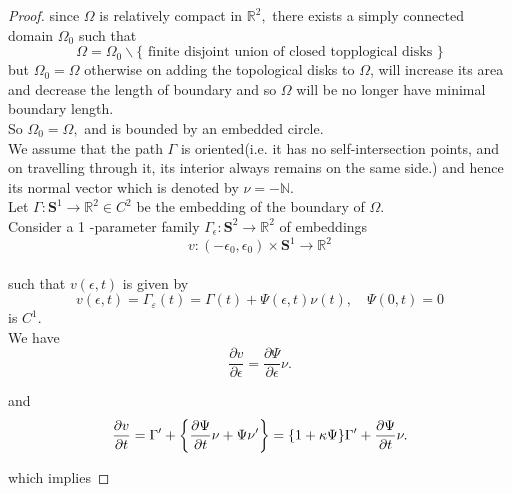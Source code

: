 \documentclass[oneside]{book}
\begin{document}
	
	\begin{proof}
		
		since $\Omega$ is relatively compact in $\mathbb{R}^{2},$ there exists a simply connected \\
		domain $\Omega_{0}$ such that
		$$
		\Omega=\Omega_{0} \backslash\{\text{ finite disjoint union of closed topplogical disks 
		}\} $$
		but $\Omega_{0}=\Omega $ otherwise on adding the topological disks to $\Omega$, will increase its area and decrease the length of boundary and so $\Omega$ will be no longer have minimal boundary length. \\
		So $\Omega_{0}=\Omega,$ and is bounded by an embedded circle.\\
		
		We assume that the path $\Gamma$ is oriented(i.e. it has no self-intersection points, and on travelling through it, its interior always remains on the same side.) and hence its normal vector which is denoted by $\nu = - \mathbb{N}$. \\
		
		
		Let $\Gamma: \mathbf{S}^{1} \rightarrow \mathbb{R}^{2} \in C^{2}$ be the embedding of the boundary of $\Omega .$ 
		\\ 
		Consider a    1 -parameter family $\Gamma_{\epsilon}: \mathbf{S}^{2} \rightarrow \mathbb{R}^{2}$ of embeddings
		$$
		v:\left(-\epsilon_{0}, \epsilon_{0}\right) \times \mathbf{S}^{1} \rightarrow \mathbb{R}^{2}
		$$ \\
		such that  $v(\epsilon, t)$ is given by \\
		\begin{equation}
			\label{eq10}  
			v(\epsilon, t)=\Gamma_{\varepsilon}(t)=\Gamma(t)+\Psi(\epsilon, t) \nu(t), \quad \Psi(0, t)=0
		\end{equation} 
		is $C^{1} .$ \\
		We have
		\begin{equation}
			\label{eq11}  
			\frac{\partial v}{\partial \epsilon}=\frac{\partial \Psi}{\partial \epsilon} \nu.
		\end{equation}
		
		and 
		\begin{equation}
			\label{eq12}  
			\\  \frac{\partial v}{\partial t}=\Gamma^{\prime}+\left\{\frac{\partial \Psi}{\partial t} \nu+\Psi \nu^{\prime}\right\}=\{1+\kappa \Psi\} \Gamma^{\prime}+\frac{\partial \Psi}{\partial t} \nu.
		\end{equation}    
		
		which implies  
		

\end{proof}
\end{document}
